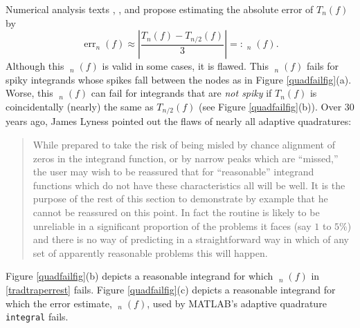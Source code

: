 \documentclass[11pt]{NSFamsart}
\DeclareMathOperator{\err}{err}
\DeclareMathOperator{\herr}{\widehat{\err}}
\def\abs#1{\ensuremath{\left \lvert #1 \right \rvert}}
\begin{document}
Numerical analysis texts  \cite[p.\ 223--224]{BurFai10}, \cite[p.\ 233]{CheKin12a}, 
and  \cite[p.\ 270]{Sau12a} propose estimating the absolute error of $T_n(f)$ by 
\begin{equation} \label{tradtraperrest}
 \err_n(f) \approx  \abs{\frac{T_n(f) - T_{n/2}(f)}{3}} =: \herr_n(f).
\end{equation}
Although this $\herr_n(f)$ is valid in some cases, it is flawed.  This $\herr_n(f)$  fails for 
spiky integrands whose 
spikes fall  between the nodes as in Figure \ref{quadfailfig}(a).  Worse, this $\herr_n(f)$ can fail 
for 
integrands that are \emph{not spiky} if $T_n(f)$ is coincidentally (nearly) 
the same as  $T_{n/2}(f)$ (see Figure \ref{quadfailfig}(b)).  Over 30 years ago, James 
Lyness \cite[p.\ 69]{Lyn83} pointed out the flaws of nearly all adaptive quadratures:
\begin{quote}
	While prepared to take the risk of being misled by chance alignment of zeros in the integrand 
	function, or by narrow peaks which are ``missed,'' the user may wish to be reassured that for 
	``reasonable'' integrand functions which do not have these characteristics all will be well. It is the 
	purpose of the rest of this section to demonstrate by example that he cannot be reassured on this 
	point. In fact the routine is likely to be unreliable in a significant proportion of the problems it faces 
	(say $1$ to $5\%$) and there is no way of predicting in a straightforward way in which of any set 
	of apparently reasonable problems this will happen.
\end{quote}
Figure \ref{quadfailfig}(b) depicts a reasonable integrand for which $\herr_n(f)$ in 
\eqref{tradtraperrest} fails.  Figure 
\ref{quadfailfig}(c) depicts a reasonable integrand for which the error estimate, $\herr_n(f)$, 
used 
by  
MATLAB's adaptive quadrature 
\texttt{integral} \cite{MAT9.3} fails.  
\end{document}
